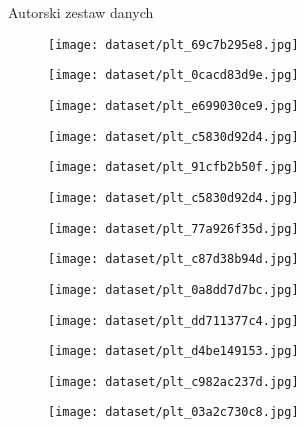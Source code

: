 \begin{easyappendix}{Autorski zestaw danych}

    \begin{figure}[H]
        \centering
        \texttt{[image: dataset/plt\_69c7b295e8.jpg]}
    \end{figure}
    \begin{figure}[H]
        \centering
        \texttt{[image: dataset/plt\_0cacd83d9e.jpg]}
    \end{figure}
    \begin{figure}[H]
        \centering
        \texttt{[image: dataset/plt\_e699030ce9.jpg]}
    \end{figure}
    \begin{figure}[H]
        \centering
        \texttt{[image: dataset/plt\_c5830d92d4.jpg]}
    \end{figure}
    \begin{figure}[H]
        \centering
        \texttt{[image: dataset/plt\_91cfb2b50f.jpg]}
    \end{figure}
    \begin{figure}[H]
        \centering
        \texttt{[image: dataset/plt\_c5830d92d4.jpg]}
    \end{figure}
    \begin{figure}[H]
        \centering
        \texttt{[image: dataset/plt\_77a926f35d.jpg]}
    \end{figure}
    \begin{figure}[H]
        \centering
        \texttt{[image: dataset/plt\_c87d38b94d.jpg]}
    \end{figure}
    \begin{figure}[H]
        \centering
        \texttt{[image: dataset/plt\_0a8dd7d7bc.jpg]}
    \end{figure}
    \begin{figure}[H]
        \centering
        \texttt{[image: dataset/plt\_dd711377c4.jpg]}
    \end{figure}
    \begin{figure}[H]
        \centering
        \texttt{[image: dataset/plt\_d4be149153.jpg]}
    \end{figure}
    \begin{figure}[H]
        \centering
        \texttt{[image: dataset/plt\_c982ac237d.jpg]}
    \end{figure}
    \begin{figure}[H]
        \centering
        \texttt{[image: dataset/plt\_03a2c730c8.jpg]}
    \end{figure}

\end{easyappendix}

